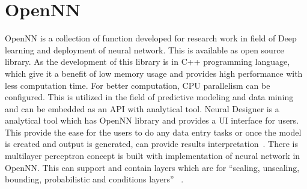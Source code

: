 \section{OpenNN}

OpenNN is a collection of function developed for research work in field of 
Deep learning and deployment of neural network. This is available as open 
source library. As the development of this library is in C++ programming 
language, which give it a benefit of low memory usage and provides high 
performance with less computation time. For better computation, CPU 
parallelism can be configured. This is utilized in the field of predictive 
modeling and data mining and can be embedded as an API with analytical tool.
 Neural Designer is a analytical tool which has OpenNN library and provides a 
UI interface for users. This provide the ease for the users to do any data 
entry tasks or once the model is created and output is generated, can provide 
results interpretation~\cite{hid-sp18-520-OpenNN}.
There is multilayer perceptron concept is built with implementation of 
neural network in OpenNN. This can support and contain layers which 
are for ``scaling, unscaling, bounding, probabilistic and conditions layers''
~\cite{hid-sp18-520-OpenNNn}. 


